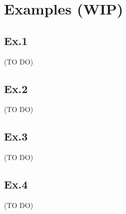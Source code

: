 \section{Examples (WIP)}
\subsection{Ex.1} (TO DO)\\
\subsection{Ex.2} (TO DO)\\
\subsection{Ex.3} (TO DO)\\
\subsection{Ex.4} (TO DO)\\
